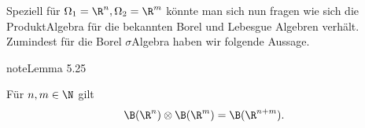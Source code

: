 \documentclass[letterpaper,10pt,german]{jupyterBook}
\begin{document}
\sphinxAtStartPar
Speziell für \(\Omega_1=\R^n, \Omega_2=\R^m\) könnte man sich nun fragen wie sich die Produkt\sphinxhyphen{}Algebra für die bekannten Borel und Lebesgue Algebren verhält. Zumindest für die Borel \(\sigma\)\sphinxhyphen{}Algebra haben wir folgende Aussage.
\label{masstheorie/integrationstechnik:lemma-1}
\begin{sphinxadmonition}{note}{Lemma 5.25}



\sphinxAtStartPar
Für \(n,m\in\N\) gilt
\begin{equation*}
\begin{split}\B(\R^n)\otimes \B(\R^m) = \B(\R^{n+m}).\end{split}
\end{equation*}\end{sphinxadmonition}
\end{document}
